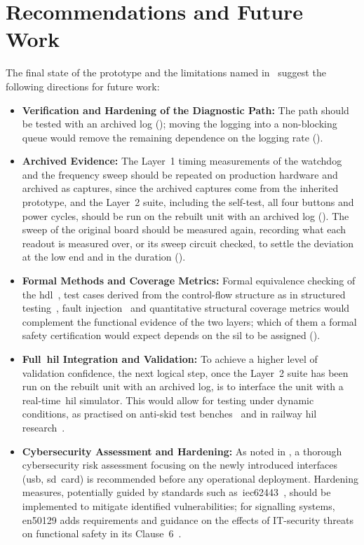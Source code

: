 \section{Recommendations and Future Work}
\label{sec:future_work}

The final state of the prototype and the limitations named in~ suggest the following directions for future work:

\begin{itemize}
	\item \textbf{Verification and Hardening of the Diagnostic Path:} The path should be tested with an archived log (); moving the logging into a non-blocking queue would remove the remaining dependence on the logging rate ().
	\item \textbf{Archived Evidence:} The Layer~1 timing measurements of the watchdog and the frequency sweep should be repeated on production hardware and archived as captures, since the archived captures come from the inherited prototype, and the Layer~2 suite, including the self-test, all four buttons and power cycles, should be run on the rebuilt unit with an archived log (). The sweep of the original board should be measured again, recording what each readout is measured over, or its sweep circuit checked, to settle the deviation at the low end and in the duration ().
	\item \textbf{Formal Methods and Coverage Metrics:} Formal equivalence checking of the \gls{hdl}~\cite{mneimneh2005sequential}, test cases derived from the control-flow structure as in structured testing~\cite{watson1996}, fault injection~\cite{ziade2004faultinjection} and quantitative structural coverage metrics would complement the functional evidence of the two layers; which of them a formal safety certification would expect depends on the \gls{sil} to be assigned ().
	\item \textbf{Full~\gls{hil} Integration and Validation:} To achieve a higher level of validation confidence, the next logical step, once the Layer~2 suite has been run on the rebuilt unit with an archived log, is to interface the unit with a real-time~\gls{hil} simulator. This would allow for testing under dynamic conditions, as practised on anti-skid test benches~\cite{zhou_wu_2020} and in railway \gls{hil} research~\cite{hil_rail_suspension_2023}.
	\item \textbf{Cybersecurity Assessment and Hardening:} As noted in , a thorough cybersecurity risk assessment focusing on the newly introduced interfaces (\gls{usb}, \gls{sd}~card) is recommended before any operational deployment. Hardening measures, potentially guided by standards such as~\gls{iec62443}~\cite{iec62443_3_3_2013}, should be implemented to mitigate identified vulnerabilities; for signalling systems, \gls{en50129} adds requirements and guidance on the effects of IT-security threats on functional safety in its Clause~6~\cite{en50129_2018}.

\end{itemize}
